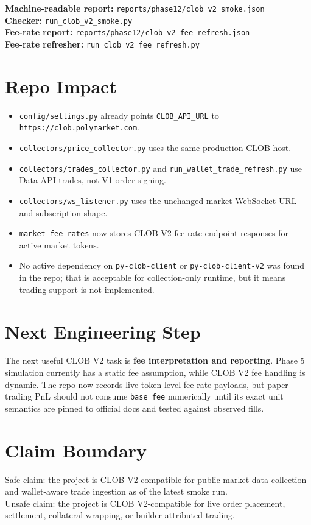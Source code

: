 \documentclass{article}
\begin{document}
\textbf{Machine-readable report:} \texttt{reports/phase12/clob\_v2\_smoke.json}\\
\textbf{Checker:} \texttt{run\_clob\_v2\_smoke.py}\\
\textbf{Fee-rate report:} \texttt{reports/phase12/clob\_v2\_fee\_refresh.json}\\
\textbf{Fee-rate refresher:} \texttt{run\_clob\_v2\_fee\_refresh.py}

\section*{Repo Impact}
\begin{itemize}[nosep]
\item \texttt{config/settings.py} already points \texttt{CLOB\_API\_URL} to \texttt{https://clob.polymarket.com}.
\item \texttt{collectors/price\_collector.py} uses the same production CLOB host.
\item \texttt{collectors/trades\_collector.py} and \texttt{run\_wallet\_trade\_refresh.py} use Data API trades, not V1 order signing.
\item \texttt{collectors/ws\_listener.py} uses the unchanged market WebSocket URL and subscription shape.
\item \texttt{market\_fee\_rates} now stores CLOB V2 fee-rate endpoint responses for active market tokens.
\item No active dependency on \texttt{py-clob-client} or \texttt{py-clob-client-v2} was found in the repo; that is acceptable for collection-only runtime, but it means trading support is not implemented.
\end{itemize}

\section*{Next Engineering Step}
The next useful CLOB V2 task is \textbf{fee interpretation and reporting}. Phase 5 simulation currently has a static fee assumption, while CLOB V2 fee handling is dynamic. The repo now records live token-level fee-rate payloads, but paper-trading PnL should not consume \texttt{base\_fee} numerically until its exact unit semantics are pinned to official docs and tested against observed fills.

\section*{Claim Boundary}
Safe claim: the project is CLOB V2-compatible for public market-data collection and wallet-aware trade ingestion as of the latest smoke run.\\
Unsafe claim: the project is CLOB V2-compatible for live order placement, settlement, collateral wrapping, or builder-attributed trading.
\end{document}
